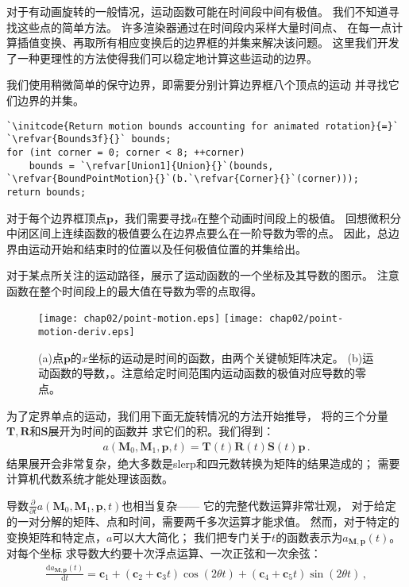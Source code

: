 对于有动画旋转的一般情况，运动函数可能在时间段中间有极值。
我们不知道寻找这些点的简单方法。
许多渲染器通过在时间段内采样大量时间点、
在每一点计算插值变换、再取所有相应变换后的边界框的并集来解决该问题。
这里我们开发了一种更理性的方法使得我们可以稳定地计算这些运动的边界。

我们使用稍微简单的保守边界，即需要分别计算边界框八个顶点的运动
并寻找它们边界的并集。
\begin{lstlisting}
`\initcode{Return motion bounds accounting for animated rotation}{=}`
`\refvar{Bounds3f}{}` bounds;
for (int corner = 0; corner < 8; ++corner)
    bounds = `\refvar[Union1]{Union}{}`(bounds, `\refvar{BoundPointMotion}{}`(b.`\refvar{Corner}{}`(corner)));
return bounds;
\end{lstlisting}

对于每个边界框顶点$\bm p$，我们需要寻找$a$在整个动画时间段上的极值。
回想微积分中闭区间上连续函数的极值要么在边界点要么在一阶导数为零的点。
因此，总边界由运动开始和结束时的位置以及任何极值位置的并集给出。

对于某点所关注的运动路径，展示了运动函数的一个坐标及其导数的图示。
注意函数在整个时间段上的最大值在导数为零的点取得。
\begin{figure}[htbp]
    \centering
    \texttt{[image: chap02/point-motion.eps]}
    \texttt{[image: chap02/point-motion-deriv.eps]}
    \caption{(a)点$\bm p$的$x$坐标的运动是时间的函数，由两个关键帧矩阵决定。
        (b)运动函数的导数，。注意给定时间范围内运动函数的极值对应导数的零点。}
    \label{fig:2.18}
\end{figure}

为了定界单点的运动，我们用下面无旋转情况的方法开始推导，
将的三个分量$\bm T,\bm R$和$\bm S$展开为时间的函数并
求它们的积。我们得到：
\begin{align}\label{eq:2.11}
    a(\bm M_0,\bm M_1,\bm p,t)=\bm T(t)\bm R(t)\bm S(t)\bm p\, .
\end{align}
结果展开会非常复杂，绝大多数是slerp和四元数转换为矩阵的结果造成的；
需要计算机代数系统才能处理该函数。

导数$\displaystyle\frac{\partial}{\partial t}a(\bm M_0,\bm M_1,\bm p,t)$也相当复杂——
它的完整代数运算非常壮观，
对于给定的一对分解的矩阵、点和时间，需要两千多次运算才能求值。
然而，对于特定的变换矩阵和特定点，$a$可以大大简化；
我们把专门关于$t$的函数表示为$a_{\bm M,\bm p}(t)$。
对每个坐标
求导数大约要十次浮点运算、一次正弦和一次余弦：
\begin{align}\label{eq:2.12}
    \frac{\mathrm{d}a_{\bm M,\bm p}(t)}{\mathrm{d}t}=\bm c_1+(\bm c_2+\bm c_3t)\cos(2\theta t)+(\bm c_4+\bm c_5t)\sin(2\theta t)\, ,
\end{align}

